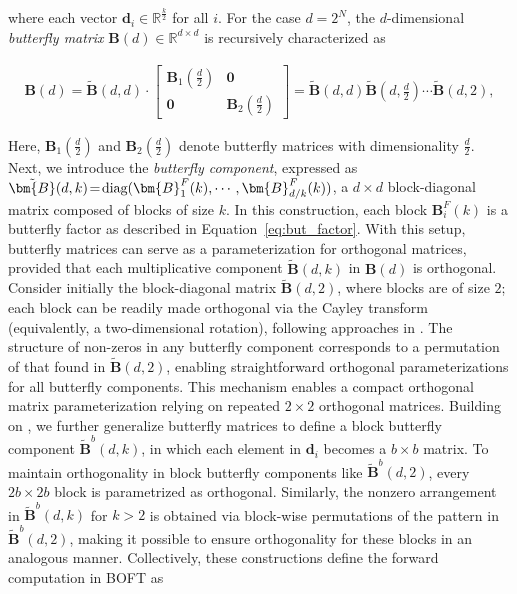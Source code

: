 where each vector $\bm{d}_i\in\mathbb{R}^{\frac{k}{2}}$ for all $i$. For the case $d=2^N$, the $d$-dimensional \emph{butterfly matrix} $\bm{B}(d)\in\mathbb{R}^{d\times d}$ is recursively characterized as

\begin{equation}
\begin{aligned}
    \!\!\bm{B}(d)=\tilde{\bm{B}}(d,d)\!\cdot\!\begin{bmatrix}
    \bm{B}_1(\frac{d}{2})\!\!\!\!\! & \bm{0} \\
    \bm{0}\!\!\!\!\! &\bm{B}_2(\frac{d}{2})
    \end{bmatrix}= \tilde{\bm{B}}(d,d)\tilde{\bm{B}}(d,\frac{d}{2})\cdots\tilde{\bm{B}}(d,2),
\end{aligned}
\end{equation}

Here, $\bm{B}_1(\frac{d}{2})$ and $\bm{B}_2(\frac{d}{2})$ denote butterfly matrices with dimensionality $\frac{d}{2}$. Next, we introduce the \emph{butterfly component}, expressed as $\thickmuskip=2mu \medmuskip=2mu \tilde{\bm{B}}(d,k)=\text{diag}(\bm{B}^F_1(k),\cdots,\bm{B}^F_{d/k}(k))$, a $d\times d$ block-diagonal matrix composed of blocks of size $k$. In this construction, each block $\bm{B}^F_i(k)$ is a butterfly factor as described in Equation~\ref{eq:but_factor}. With this setup, butterfly matrices can serve as a parameterization for orthogonal matrices, provided that each multiplicative component $\tilde{\bm{B}}(d,k)$ in $\bm{B}(d)$ is orthogonal. Consider initially the block-diagonal matrix $\tilde{\bm{B}}(d,2)$, where blocks are of size $2$; each block can be readily made orthogonal via the Cayley transform (equivalently, a two-dimensional rotation), following approaches in \cite{liu2021orthogonal,qiu2023controlling}. The structure of non-zeros in any butterfly component corresponds to a permutation of that found in $\tilde{\bm{B}}(d,2)$, enabling straightforward orthogonal parameterizations for all butterfly components. This mechanism enables a compact orthogonal matrix parameterization relying on repeated $2\times 2$ orthogonal matrices. Building on \cite{chen2022pixelated}, we further generalize butterfly matrices to define a block butterfly component $\tilde{\bm{B}}^b(d,k)$, in which each element in $\bm{d}_i$ becomes a $b\times b$ matrix. To maintain orthogonality in block butterfly components like $\tilde{\bm{B}}^b(d,2)$, every $2b\times 2b$ block is parametrized as orthogonal. Similarly, the nonzero arrangement in $\tilde{\bm{B}}^b(d,k)$ for $k>2$ is obtained via block-wise permutations of the pattern in $\tilde{\bm{B}}^b(d,2)$, making it possible to ensure orthogonality for these blocks in an analogous manner. Collectively, these constructions define the forward computation in BOFT as

